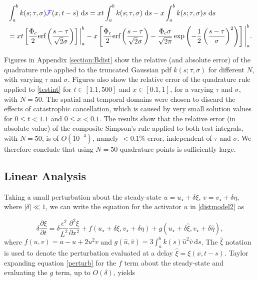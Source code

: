 \begin{equation}
    \begin{split}
&\int_a^bk(s;\tau,\sigma)\tb{\mathcal{F}}(x,t-s)\ \text{d}s=xt\int_a^bk(s;\tau,\sigma)\ \text{d}s-x\int_a^bk(s;\tau,\sigma)s\ \text{d}s\\&=xt\left[\frac{\Phi_c}{2}\text{erf}\left(\frac{s-\tau}{\sqrt{2}\sigma}\right)\right]\bigg|_a^b-x\left[\frac{\Phi_c}{2}\text{erf}\left(\frac{s-\tau}{\sqrt{2}\sigma}\right)-\frac{\Phi_c\sigma}{\sqrt{2\pi}}\exp\left(-\frac{1}{2}\left(\frac{s-\tau}{\sigma}\right)^2 \right)\right]\Bigg|_a^b.
    \end{split}
\end{equation}

Figures in Appendix \ref{section:Bdist} show the relative (and absolute error) of the quadrature rule applied to the truncated Gaussian pdf $k(s;\tau,\sigma)$ for different $N$, with varying $\tau$ and $\sigma$. Figures also show the relative error of the quadrature rule applied to \eqref{testint} for $t\in[1.1,500]$ and $x\in[0.1,1]$, for a varying $\tau$ and $\sigma$, with $N=50$. The spatial and temporal domains were chosen to discard the effects of catastrophic cancellation, which is caused by very small solution values for $0\leq t<1.1$ and $0\leq x<0.1$. The results show that the relative error (in absolute value) of the composite Simpson's rule applied to both test integrals, with $N=50$, is of $O(10^{-4})$, namely $<0.1\%$ error, independent of $\tau$ and $\sigma$. We therefore conclude that using $N=50$ quadrature points is sufficiently large.


\subsection{Linear Analysis}\label{section:distlin}
Taking a small perturbation about the steady-state $u=u_\star+\delta\xi$, $v=v_\star+\delta\eta$, where $|\delta|\ll1$, we can write the equation for the activator $u$ in \eqref{distmodel2} as

\begin{equation}\label{perturb}
  \delta\frac{\partial \xi}{\partial t}=\delta \frac{\epsilon^2}{L^2}\frac{\partial^2\xi}{\partial x^2}+f(u_\star+\delta\xi, v_\star+\delta\eta)+g(u_\star+\delta\hat{\xi},v_\star+\delta\hat{\eta}) ,
\end{equation}
where $f(u,v)=a-u+2u^2v$ and $g(\hat{u},\hat{v})=3\int_a^bk(s)\hat{u}^2\hat{v}\ \text{d}s$. The $\hat{\xi}$ notation is used to denote the perturbation evaluated at a delay $\hat{\xi}=\xi(x,t-s)$. Taylor expanding equation \eqref{perturb} for the $f$ term about the steady-state and evaluating the $g$ term, up to $O(\delta)$, yields

